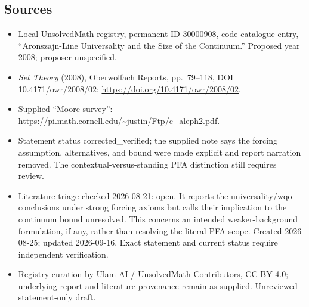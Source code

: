 \documentclass[11pt]{article}
\begin{document}
\subsection{Sources}
\begin{itemize}
\item Local UnsolvedMath registry, permanent ID 30000908, code catalogue entry, ``Aronszajn-Line Universality and the Size of the Continuum.'' Proposed year 2008; proposer unspecified.
\item \emph{Set Theory} (2008), Oberwolfach Reports, pp.\ 79--118, DOI 10.4171/owr/2008/02; \url{https://doi.org/10.4171/owr/2008/02}.
\item Supplied ``Moore survey'': \url{https://pi.math.cornell.edu/~justin/Ftp/c_aleph2.pdf}.
\item Statement status corrected\_verified; the supplied note says the forcing assumption, alternatives, and bound were made explicit and report narration removed. The contextual-versus-standing PFA distinction still requires review.
\item Literature triage checked 2026-08-21: open. It reports the universality/wqo conclusions under strong forcing axioms but calls their implication to the continuum bound unresolved. This concerns an intended weaker-background formulation, if any, rather than resolving the literal PFA scope. Created 2026-08-25; updated 2026-09-16. Exact statement and current status require independent verification.
\item Registry curation by Ulam AI / UnsolvedMath Contributors, CC BY 4.0; underlying report and literature provenance remain as supplied. Unreviewed statement-only draft.
\end{itemize}
\end{document}
